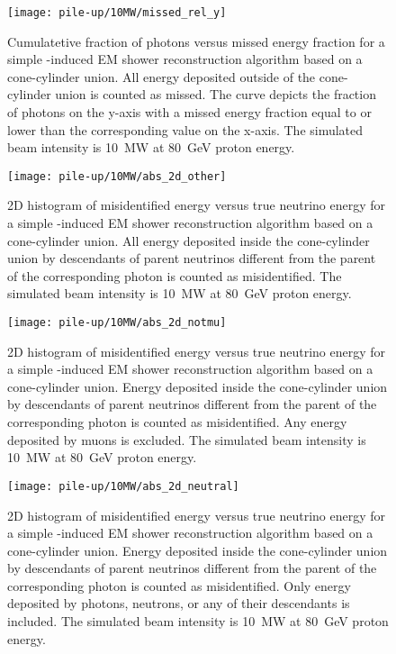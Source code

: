\begin{figure}[htb]
	\centering
	\texttt{[image: pile-up/10MW/missed\_rel\_y]}
	\caption{Cumulatetive fraction of photons versus missed energy fraction for a simple \Pgpz-induced EM shower reconstruction algorithm based on a cone-cylinder union.
		All energy deposited outside of the cone-cylinder union is counted as missed.
		The curve depicts the fraction of photons on the y-axis with a missed energy fraction equal to or lower than the corresponding value on the x-axis.
		The simulated beam intensity is \SI{10}{\mega\watt} at \SI{80}{\giga\electronvolt} proton energy.}
\end{figure}

\begin{figure}[htb]
	\centering
	\texttt{[image: pile-up/10MW/abs\_2d\_other]}
	\caption{2D histogram of misidentified energy versus true neutrino energy for a simple \Pgpz-induced EM shower reconstruction algorithm based on a cone-cylinder union.
		All energy deposited inside the cone-cylinder union by descendants of parent neutrinos different from the parent of the corresponding \Pgpz photon is counted as misidentified.
		The simulated beam intensity is \SI{10}{\mega\watt} at \SI{80}{\giga\electronvolt} proton energy.}
\end{figure}

\begin{figure}[htb]
	\centering
	\texttt{[image: pile-up/10MW/abs\_2d\_notmu]}
	\caption{2D histogram of misidentified energy versus true neutrino energy for a simple \Pgpz-induced EM shower reconstruction algorithm based on a cone-cylinder union.
		Energy deposited inside the cone-cylinder union by descendants of parent neutrinos different from the parent of the corresponding \Pgpz photon is counted as misidentified.
		Any energy deposited by muons is excluded.
		The simulated beam intensity is \SI{10}{\mega\watt} at \SI{80}{\giga\electronvolt} proton energy.}
\end{figure}

\begin{figure}[htb]
	\centering
	\texttt{[image: pile-up/10MW/abs\_2d\_neutral]}
	\caption{2D histogram of misidentified energy versus true neutrino energy for a simple \Pgpz-induced EM shower reconstruction algorithm based on a cone-cylinder union.
		Energy deposited inside the cone-cylinder union by descendants of parent neutrinos different from the parent of the corresponding \Pgpz photon is counted as misidentified.
		Only energy deposited by photons, neutrons, or any of their descendants is included.
		The simulated beam intensity is \SI{10}{\mega\watt} at \SI{80}{\giga\electronvolt} proton energy.}
\end{figure}

